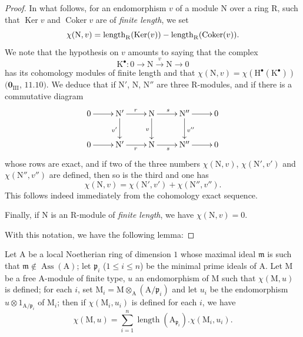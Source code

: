 \begin{proof}
In what follows, for an endomorphism $v$ of a module $\mathrm{N}$ over a ring $\mathrm{R}$, such that $\operatorname{Ker} v$ and $\operatorname{Coker} v$ are of \emph{finite length}, we set
\[
  \chi(\mathrm{N},v)=\operatorname{length}_{\mathrm{R}}(\operatorname{Ker}(v))-\operatorname{length}_{\mathrm{R}}(\operatorname{Coker}(v)).
\]
We note that the hypothesis on $v$ amounts to saying that the complex
\[
  \mathrm{K}^\bullet:0\to\mathrm{N}\xrightarrow{v}\mathrm{N}\to 0
\]
has its cohomology modules of finite length and that $\chi(\mathrm{N},v)=\chi(\mathrm{H}^\bullet(\mathrm{K}^\bullet))$ $(\mathbf{0}_{\mathrm{III}}$, $11.10)$.
We deduce that if $\mathrm{N}'$, $\mathrm{N}$, $\mathrm{N}''$ are three $\mathrm{R}$-modules, and if there is a commutative diagram
\[
  \xymatrix{
    0 \ar[r] & \mathrm{N}' \ar[r]^r \ar[d]_{v'} & \mathrm{N} \ar[r]^s \ar[d]_v & \mathrm{N}'' \ar[r] \ar[d]^{v''} & 0\\
    0 \ar[r] & \mathrm{N}' \ar[r]_r & \mathrm{N} \ar[r]_s & \mathrm{N}'' \ar[r] & 0
  }
\]
whose rows are exact, and if two of the three numbers $\chi(\mathrm{N},v)$, $\chi(\mathrm{N}',v')$ and $\chi(\mathrm{N}'',v'')$ are defined, then so is the third and one has
\[
\label{IV.21.10.17.6}
  \chi(\mathrm{N},v)=\chi(\mathrm{N}',v')+\chi(\mathrm{N}'',v'').
  \tag{21.10.17.6}
\]
This follows indeed immediately from the cohomology exact sequence.

Finally, if $\mathrm{N}$ is an $\mathrm{R}$-module of \emph{finite length}, we have $\chi(\mathrm{N},v)=0$.

With this notation, we have the following lemma:
\end{proof}

\begin{lemma}[21.10.17.7]
\label{IV.21.10.17.7}
Let $\mathrm{A}$ be a local Noetherian ring of dimension $1$ whose maximal ideal $\mathfrak{m}$ is such that $\mathfrak{m}\notin\operatorname{Ass}(\mathrm{A})$; let $\mathfrak{p}_i$ ($1\leq i\leq n$) be the minimal prime ideals of $\mathrm{A}$.
Let $\mathrm{M}$ be a free A-module of finite type, $u$ an endomorphism of $\mathrm{M}$ such that $\chi(\mathrm{M},u)$ is defined; for each $i$, set $\mathrm{M}_i=\mathrm{M}\otimes_{\mathrm{A}}(\mathrm{A}/\mathfrak{p}_i)$ and let $u_i$ be the endomorphism $u\otimes 1_{\mathrm{A}/\mathfrak{p}_i}$ of $\mathrm{M}_i$; then if $\chi(\mathrm{M}_i,u_i)$ is defined for each $i$, we have
\[
\label{IV.21.10.17.8}
  \chi(\mathrm{M},u)=\sum_{i=1}^n\operatorname{length}(\mathrm{A}_{\mathfrak{p}_i}).\chi(\mathrm{M}_i,u_i).
  \tag{21.10.17.8}
\]
\end{lemma}

